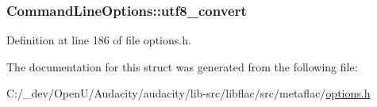 \subsubsection[{\texorpdfstring{utf8\+\_\+convert}{utf8_convert}}]{ Command\+Line\+Options\+::utf8\+\_\+convert}\hypertarget{struct_command_line_options_afd2f4579cce9cd358877e5d2e788d2c2}{}\label{struct_command_line_options_afd2f4579cce9cd358877e5d2e788d2c2}


Definition at line 186 of file options.\+h.



The documentation for this struct was generated from the following file\+:\begin{DoxyCompactItemize}
\item 
C\+:/\+\_\+dev/\+Open\+U/\+Audacity/audacity/lib-\/src/libflac/src/metaflac/\hyperlink{libflac_2src_2metaflac_2options_8h}{options.\+h}\end{DoxyCompactItemize}
